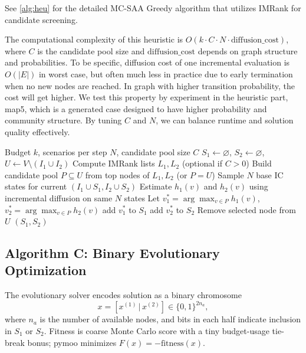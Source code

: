 \documentclass[onecolumn,a4paper,12pt]{IEEEtran}
\begin{document}
See \ref{alg:heu} for the detailed MC-SAA Greedy algorithm that utilizes IMRank for candidate screening.

The computational complexity of this heuristic is $O(k \cdot C \cdot N \cdot \text{diffusion\_cost})$, where $C$ is the candidate pool size and $\text{diffusion\_cost}$ depends on graph structure and probabilities. To be specific, diffusion cost of one incremental evaluation is $O(|E|)$ in worst case, but often much less in practice due to early termination when no new nodes are reached. In graph with higher transition probability, the cost will get higher. We test this property by experiment in the heuristic part, map5, which is a generated case designed to have higher probability and community structure. By tuning $C$ and $N$, we can balance runtime and solution quality effectively.

\begin{algorithm}[h]
\caption{MC-SAA Greedy with IMRank Candidate Pool}
\label{alg:heu}
\begin{algorithmic}[1]
\Require Budget $k$, scenarios per step $N$, candidate pool size $C$
\State $S_1\gets\varnothing$, $S_2\gets\varnothing$, $U\gets V\setminus(I_1\cup I_2)$
\State Compute IMRank lists $L_1,L_2$ (optional if $C>0$)
                \State Build candidate pool $P\subseteq U$ from top nodes of $L_1,L_2$ (or $P=U$)
                \State Sample $N$ base IC states for current $(I_1\cup S_1, I_2\cup S_2)$
                                \State Estimate $h_1(v)$ and $h_2(v)$ using incremental diffusion on same $N$ states
                \EndFor
                \State Let $v_1^*=\arg\max_{v\in P} h_1(v)$, $v_2^*=\arg\max_{v\in P} h_2(v)$
                 add $v_1^*$ to $S_1$ \Else add $v_2^*$ to $S_2$ \EndIf
                \State Remove selected node from $U$
\EndFor
\State \Return $(S_1,S_2)$
\end{algorithmic}
\end{algorithm}

\subsection{Algorithm C: Binary Evolutionary Optimization}
The evolutionary solver encodes solution as a binary chromosome
\begin{equation}
x=[x^{(1)}\,|\,x^{(2)}] \in \{0,1\}^{2n_a},
\end{equation}
where $n_a$ is the number of available nodes, and bits in each half indicate inclusion in $S_1$ or $S_2$. Fitness is coarse Monte Carlo score with a tiny budget-usage tie-break bonus; pymoo minimizes $F(x)=-\text{fitness}(x)$.
\end{document}
